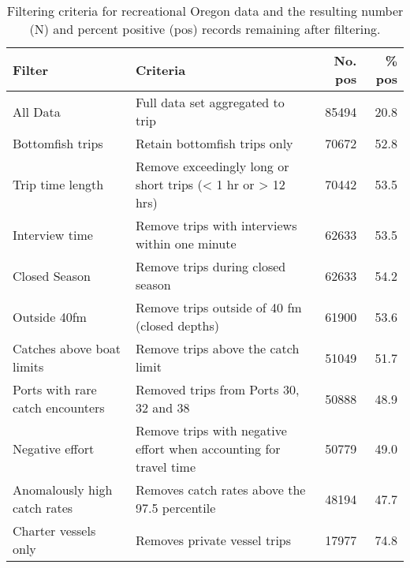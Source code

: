
\begin{longtable}[t]{l>{\raggedright\arraybackslash}p{6cm}rr}
\caption{\label{tab:cpue-recreationalOregon-filter}Filtering criteria for recreational Oregon data and the resulting number (N) and percent positive (pos) records remaining after filtering.}\\
\toprule
Filter & Criteria & No. pos & \% pos\\
\midrule
All Data & Full data set aggregated to trip & 85494 & 20.8\\
Bottomfish trips & Retain bottomfish trips only & 70672 & 52.8\\
Trip time length & Remove exceedingly long or short trips (< 1 hr or > 12 hrs) & 70442 & 53.5\\
Interview time & Remove trips with interviews within one minute & 62633 & 53.5\\
Closed Season & Remove trips during closed season & 62633 & 54.2\\
\addlinespace
Outside 40fm & Remove trips outside of 40 fm (closed depths) & 61900 & 53.6\\
Catches above boat limits & Remove trips above the catch limit & 51049 & 51.7\\
Ports with rare catch encounters & Removed trips from Ports 30, 32 and 38 & 50888 & 48.9\\
Negative effort & Remove trips with negative effort when accounting for travel time & 50779 & 49.0\\
Anomalously high catch rates & Removes catch rates above the 97.5 percentile & 48194 & 47.7\\
\addlinespace
Charter vessels only & Removes private vessel trips & 17977 & 74.8\\
\bottomrule
\end{longtable}
